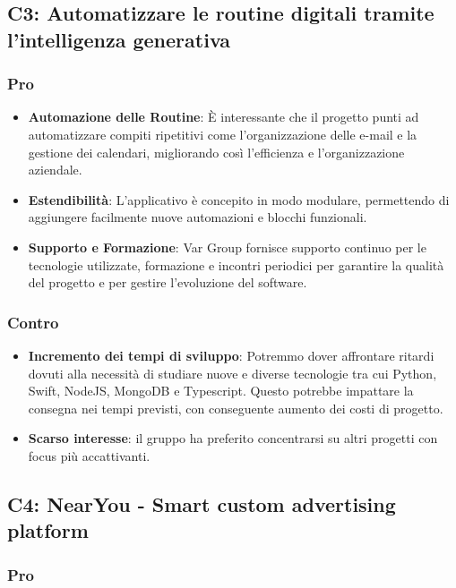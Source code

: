 \subsection{C3:	Automatizzare le routine digitali tramite l’intelligenza generativa}

\subsubsection{Pro}

\begin{itemize}
    \item \textbf{Automazione delle Routine}: È interessante che il progetto punti ad automatizzare compiti ripetitivi come l’organizzazione delle e-mail e la gestione dei calendari, migliorando così l’efficienza e l'organizzazione aziendale.
    \item \textbf{Estendibilità}: L’applicativo è concepito in modo modulare, permettendo di aggiungere facilmente nuove automazioni e blocchi funzionali.
    \item \textbf{Supporto e Formazione}: Var Group fornisce supporto continuo per le tecnologie utilizzate, formazione e incontri periodici per garantire la qualità del progetto e per gestire l'evoluzione del software.
\end{itemize}

\subsubsection{Contro}

\begin{itemize}
    \item \textbf{Incremento dei tempi di sviluppo}: Potremmo dover affrontare ritardi dovuti alla necessità di studiare nuove e diverse tecnologie tra cui Python, Swift, NodeJS, MongoDB e Typescript. Questo potrebbe impattare la consegna nei tempi previsti, con conseguente aumento dei costi di progetto.
    \item \textbf{Scarso interesse}: il gruppo ha preferito concentrarsi su altri progetti con focus più accattivanti.
\end{itemize}


\subsection{C4:	NearYou - Smart custom advertising platform}

\subsubsection{Pro}

